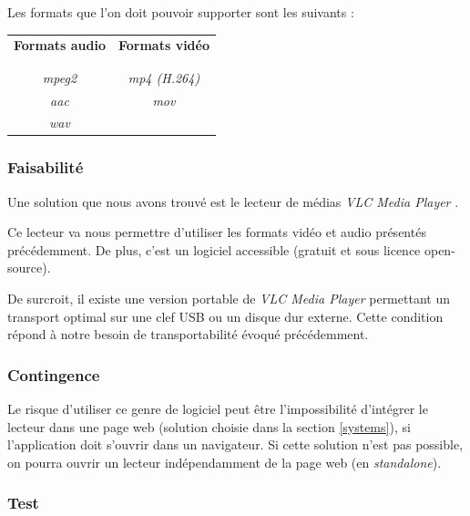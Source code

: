 Les formats que l’on doit pouvoir supporter sont les suivants :\\

\begin{center}
\begin{tabular}{c|c}
\textbf{Formats audio} & \textbf{Formats vidéo} \\
\\
\hline
\\
\textit{mpeg2} & \textit{mp4 (H.264)}\\
\textit{aac} & \textit{mov}\\
\textit{wav} & ~
\end{tabular}
\end{center}
\vspace{0.6cm}

\subsubsection{Faisabilité}

Une solution que nous avons trouvé est le lecteur de médias \textit{VLC Media Player} \cite{solutions2006vlc}.

Ce lecteur va nous permettre d'utiliser les formats vidéo et audio présentés précédemment. De plus, c'est un logiciel accessible (gratuit et sous licence open-source).

De surcroit, il existe une version portable de \textit{VLC Media Player} permettant un transport optimal sur une clef USB ou un disque dur externe. Cette condition répond à notre besoin de transportabilité évoqué précédemment.

\subsubsection{Contingence}

Le risque d’utiliser ce genre de logiciel peut être l'impossibilité d'intégrer le lecteur dans une page web (solution choisie dans la section \ref{systems}), si l’application doit s’ouvrir dans un navigateur. Si cette solution n’est pas possible, on pourra ouvrir un lecteur indépendamment de la page web (en \textit{standalone}).

\subsubsection{Test}

